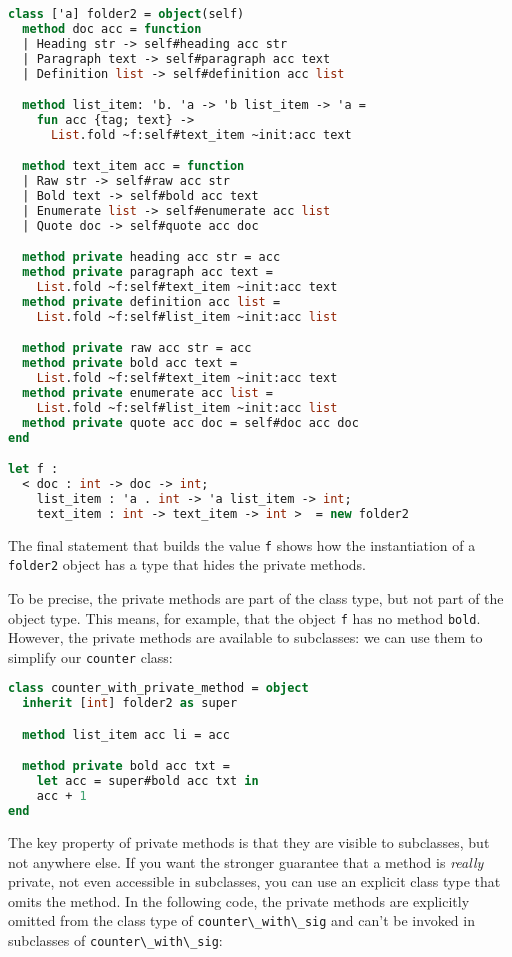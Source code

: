 \begin{lstlisting}[language=Caml]
class ['a] folder2 = object(self)
  method doc acc = function
  | Heading str -> self#heading acc str
  | Paragraph text -> self#paragraph acc text
  | Definition list -> self#definition acc list

  method list_item: 'b. 'a -> 'b list_item -> 'a =
    fun acc {tag; text} ->
      List.fold ~f:self#text_item ~init:acc text

  method text_item acc = function
  | Raw str -> self#raw acc str
  | Bold text -> self#bold acc text
  | Enumerate list -> self#enumerate acc list
  | Quote doc -> self#quote acc doc

  method private heading acc str = acc
  method private paragraph acc text =
    List.fold ~f:self#text_item ~init:acc text
  method private definition acc list =
    List.fold ~f:self#list_item ~init:acc list

  method private raw acc str = acc
  method private bold acc text =
    List.fold ~f:self#text_item ~init:acc text
  method private enumerate acc list =
    List.fold ~f:self#list_item ~init:acc list
  method private quote acc doc = self#doc acc doc
end

let f :
  < doc : int -> doc -> int;
    list_item : 'a . int -> 'a list_item -> int;
    text_item : int -> text_item -> int >  = new folder2
\end{lstlisting}

The final statement that builds the value \passthrough{\lstinline!f!}
shows how the instantiation of a \passthrough{\lstinline!folder2!}
object has a type that hides the private methods.

To be precise, the private methods are part of the class type, but not
part of the object type. This means, for example, that the object
\passthrough{\lstinline!f!} has no method
\passthrough{\lstinline!bold!}. However, the private methods are
available to subclasses: we can use them to simplify our
\passthrough{\lstinline!counter!} class:

\begin{lstlisting}[language=Caml]
class counter_with_private_method = object
  inherit [int] folder2 as super

  method list_item acc li = acc

  method private bold acc txt =
    let acc = super#bold acc txt in
    acc + 1
end
\end{lstlisting}

The key property of private methods is that they are visible to
subclasses, but not anywhere else. If you want the stronger guarantee
that a method is \emph{really} private, not even accessible in
subclasses, you can use an explicit class type that omits the method. In
the following code, the private methods are explicitly omitted from the
class type of \passthrough{\lstinline!counter\_with\_sig!} and can't be
invoked in subclasses of \passthrough{\lstinline!counter\_with\_sig!}:

